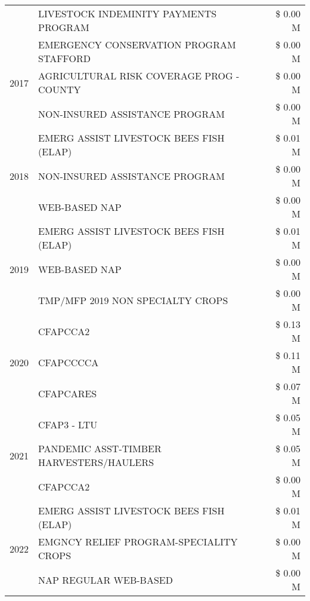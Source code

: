 \begin{tabular}{llr}
 & LIVESTOCK INDEMINITY PAYMENTS PROGRAM & \$ 0.00 M \\
\cline{1-3}
\multirow[t]{3}{*}{2017} & EMERGENCY CONSERVATION PROGRAM STAFFORD & \$ 0.00 M \\
 & AGRICULTURAL RISK COVERAGE PROG - COUNTY & \$ 0.00 M \\
 & NON-INSURED ASSISTANCE PROGRAM & \$ 0.00 M \\
\cline{1-3}
\multirow[t]{3}{*}{2018} & EMERG ASSIST LIVESTOCK BEES FISH (ELAP) & \$ 0.01 M \\
 & NON-INSURED ASSISTANCE PROGRAM & \$ 0.00 M \\
 & WEB-BASED NAP & \$ 0.00 M \\
\cline{1-3}
\multirow[t]{3}{*}{2019} & EMERG ASSIST LIVESTOCK BEES FISH (ELAP) & \$ 0.01 M \\
 & WEB-BASED NAP & \$ 0.00 M \\
 & TMP/MFP 2019 NON SPECIALTY CROPS & \$ 0.00 M \\
\cline{1-3}
\multirow[t]{3}{*}{2020} & CFAPCCA2 & \$ 0.13 M \\
 & CFAPCCCCA & \$ 0.11 M \\
 & CFAPCARES & \$ 0.07 M \\
\cline{1-3}
\multirow[t]{3}{*}{2021} & CFAP3 - LTU & \$ 0.05 M \\
 & PANDEMIC ASST-TIMBER HARVESTERS/HAULERS & \$ 0.05 M \\
 & CFAPCCA2 & \$ 0.00 M \\
\cline{1-3}
\multirow[t]{3}{*}{2022} & EMERG ASSIST LIVESTOCK BEES FISH (ELAP) & \$ 0.01 M \\
 & EMGNCY RELIEF PROGRAM-SPECIALITY CROPS & \$ 0.00 M \\
 & NAP REGULAR WEB-BASED & \$ 0.00 M \\
\cline{1-3}
\bottomrule
\end{tabular}
